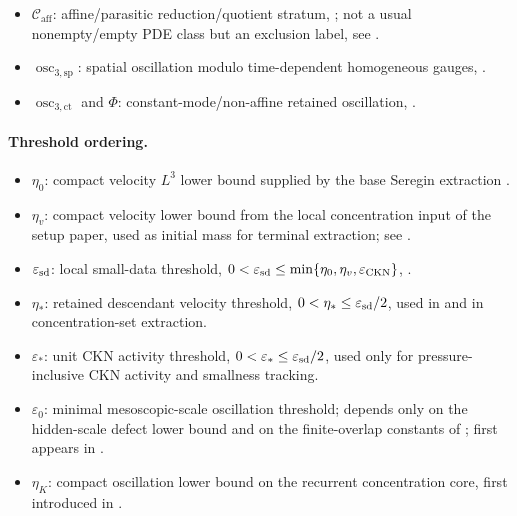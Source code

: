 \documentclass[11pt]{amsart}
\numberwithin{equation}{section}
\theoremstyle{plain}
\theoremstyle{definition}
\theoremstyle{remark}
\newcommand{\eps}{\varepsilon}
\newcommand{\CKN}{\mathrm{CKN}}
\newcommand{\Caff}{\mathcal C_{\mathrm{aff}}}
\newcommand{\oscsp}{\operatorname{osc}_{3,\mathrm{sp}}}
\newcommand{\actthree}{\operatorname{osc}_{3,\mathrm{ct}}}
\begin{document}
\begin{itemize}[leftmargin=1.6em]
      \((\bar W,\mathcal Y,\Lambda)\), .
   \item \(\Caff\): affine/parasitic reduction/quotient stratum,
      ; not a usual nonempty/empty PDE
      class but an exclusion label, see
      .
   \item \(\oscsp\): spatial oscillation modulo time-dependent homogeneous
      gauges, .
   \item \(\actthree\) and \(\Phi\): constant-mode/non-affine retained
      oscillation, .
\end{itemize}

\paragraph{Threshold ordering.}
\begin{itemize}[leftmargin=1.6em]
   \item \(\eta_0\): compact velocity \(L^3\) lower bound supplied by the base
      Seregin extraction .
   \item \(\eta_v\): compact velocity lower bound from the local concentration
      input of the setup paper, used as initial mass for terminal extraction;
      see .
   \item \(\eps_{\rm sd}\): local small-data threshold,
      \(0<\eps_{\rm sd}\le\min\{\eta_0,\eta_v,\eps_{\CKN}\}\),
      .
   \item \(\eta_*\): retained descendant velocity threshold,
      \(0<\eta_*\le\eps_{\rm sd}/2\), used in
       and in concentration-set extraction.
   \item \(\eps_*\): unit CKN activity threshold,
      \(0<\eps_*\le\eps_{\rm sd}/2\), used only for pressure-inclusive
      CKN activity and smallness tracking.
   \item \(\eps_0\): minimal mesoscopic-scale oscillation threshold; depends
      only on the hidden-scale defect lower bound and on the finite-overlap
      constants of ; first appears
      in .
   \item \(\eta_K\): compact oscillation lower bound on the recurrent concentration core,
      first introduced in .
\end{itemize}
\end{document}
